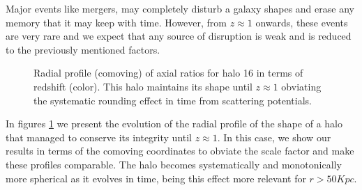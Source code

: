 Major events like mergers, may completely disturb a galaxy shapes and erase any memory that it may keep with time. However, from $z\approx 1$ onwards, these events are very rare \cite{Tormen_et_al._1998} and we expect that any source of disruption is weak and is reduced to the previously mentioned factors. \\  

\begin{figure}[!ht]
  \centering
  \hfill
  \caption{Radial profile (comoving) of axial ratios for halo 16 in terms of redshift (color). This halo maintains its shape until $z\approx 1$ obviating the systematic rounding effect in time from scattering potentials. }
  \label{fig:RedshiftGood}
\end{figure}

In figures \ref{fig:RedshiftGood} we present the evolution of the radial profile of the shape of a halo that managed to conserve its integrity until $z \approx 1$. In this case, we show our results in terms of the comoving coordinates to obviate the scale factor and make these profiles comparable. The halo becomes systematically and monotonically more spherical as it evolves in time, being this effect more relevant for $r>50Kpc$.\\

